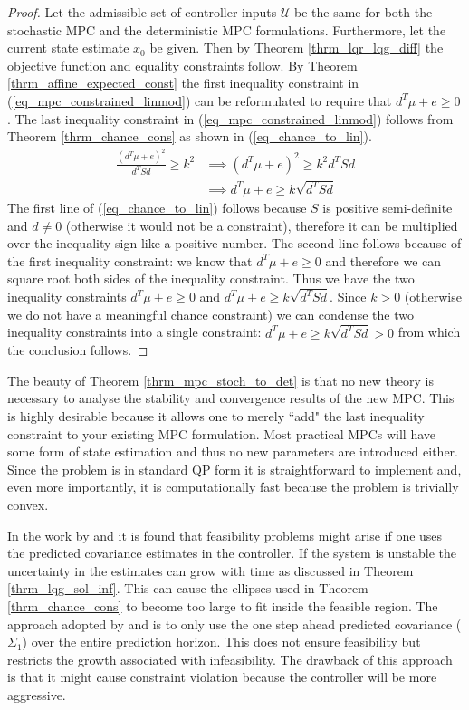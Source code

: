 \begin{proof}
Let the admissible set of controller inputs $\mathcal{U}$ be the same for both the stochastic MPC and the deterministic MPC formulations. Furthermore, let the current state estimate $x_0$ be given. Then by Theorem \ref{thrm_lqr_lqg_diff} the objective function and equality constraints follow. By Theorem \ref{thrm_affine_expected_const} the first inequality constraint in (\ref{eq_mpc_constrained_linmod}) can be reformulated to require that $d^T\mu + e \geq 0$. The last inequality constraint in (\ref{eq_mpc_constrained_linmod}) follows from Theorem \ref{thrm_chance_cons} as shown in (\ref{eq_chance_to_lin}).
\begin{equation}
\begin{aligned}
\frac{(d^T\mu+e)^2}{d^TSd} \geq k^2 &\implies (d^T\mu+e)^2 \geq k^2 {d^TSd} \\
&\implies d^T\mu+e \geq k \sqrt{d^TSd}
\end{aligned}
\label{eq_chance_to_lin}
\end{equation}
The first line of (\ref{eq_chance_to_lin}) follows because $S$ is positive semi-definite and $d \neq 0$ (otherwise it would not be a constraint), therefore it can be multiplied over the inequality sign like a positive number. The second line follows because of the first inequality constraint: we know that $d^T\mu+e \geq 0$ and therefore we can square root both sides of the inequality constraint. Thus we have the two inequality constraints $d^T\mu+e \geq 0$ and $d^T\mu+e \geq k \sqrt{d^TSd}$. Since $k > 0$ (otherwise we do not have a meaningful chance constraint) we can condense the two inequality constraints into a single constraint: $d^T\mu+e \geq k \sqrt{d^TSd} > 0$ from which the conclusion follows.  
\end{proof}
The beauty of Theorem \ref{thrm_mpc_stoch_to_det} is that no new theory is necessary to analyse the stability and convergence results of the new MPC. This is highly desirable because it allows one to merely ``add" the last inequality constraint to your existing MPC formulation. Most practical MPCs will have some form of state estimation and thus no new parameters are introduced either. Since the problem is in standard QP form it is straightforward to implement and, even more importantly, it is computationally fast because the problem is trivially convex.

In the work by \cite{yan1} and \cite{yan2} it is found that feasibility problems might arise if one uses the predicted covariance estimates in the controller. If the system is unstable the uncertainty in the estimates can grow with time as discussed in Theorem \ref{thrm_lqg_sol_inf}. This can cause the ellipses used in Theorem \ref{thrm_chance_cons} to become too large to fit inside the feasible region. The approach adopted by \cite{yan1} and \cite{yan2} is to only use the one step ahead predicted covariance ($\Sigma_1$) over the entire prediction horizon. This does not ensure feasibility but restricts the growth associated with infeasibility. The drawback of this approach is that it might cause constraint violation because the controller will be more aggressive.  
